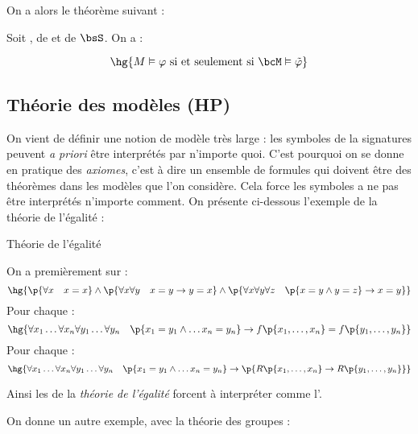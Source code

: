     On a alors le théorème suivant :
    
    \begin{theorem}{}{}
        Soit ,  de  et  de $\bsS$. On a :
        
        \[ \hg{M \vDash \varphi \ \text{si et seulement si} \ \bcM \vDash \tilde{\varphi} } \]
    \end{theorem}
    
    \subsection{Théorie des modèles (HP)}
    
    On vient de définir une notion de modèle très large : les symboles de la signatures peuvent \textit{a priori} être interprétés par n'importe quoi. C'est pourquoi on se donne en pratique des \textit{axiomes}, c'est à dire un ensemble de formules qui doivent être des théorèmes dans les modèles que l'on considère. Cela force les symboles a ne pas être interprétés n'importe comment. On présente ci-dessous l'exemple de la théorie de l'égalité :
    
    \begin{example}{Théorie de l'égalité}{}
        \begin{enumerate}
            \itt On a premièrement sur \hg{$=$} :
            \[ \hg{\p{\forall x \quad x = x} \land \p{\forall x \forall y \quad x=y \rightarrow y = x} \land \p{\forall x \forall y \forall z \quad \p{x = y \land y = z} \rightarrow x = y}}\]
            \itt Pour chaque  :
            \[ \hg{\forall x_1 \dots \forall x_n \forall y_1 \dots \forall y_n\quad \p{x_1 = y_1 \land \dots x_n = y_n} \rightarrow f\p{x_1, \dots, x_n} = f\p{y_1, \dots, y_n}}\]
            \itt Pour chaque  :
            \[ \hg{\forall x_1 \dots \forall x_n \forall y_1 \dots \forall y_n\quad \p{x_1 = y_1 \land \dots x_n = y_n} \rightarrow \p{R\p{x_1, \dots, x_n} \rightarrow R\p{y_1, \dots, y_n}}}\]
        \end{enumerate}
        
        Ainsi les  de la \textit{théorie de l'égalité} forcent à interpréter \hg{$=$} comme l'.
    \end{example}
    
    On donne un autre exemple, avec la théorie des groupes :
    
